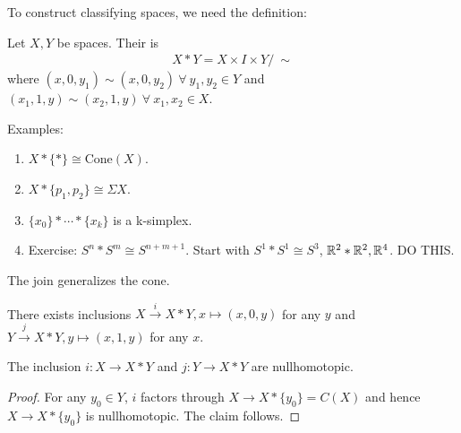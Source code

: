 \documentclass[12pt,class=article,crop=false]{standalone}
\begin{document}
To construct classifying spaces, we need the definition:
\begin{defn}
Let $ X,Y$ be spaces. Their   is
\begin{align*}
	X *Y = X \times I \times Y / \ \sim
\end{align*}
where $ (x,0,y_1) \sim (x,0,y_2) \ \forall \ y_1,y_2 \in Y$ and $ (x_1,1,y) \sim (x_2,1,y) \ \forall \ x_1,x_2 \in X$.
\end{defn}
Examples:
\begin{enumerate}[label=(\arabic*)]
	\item $ X* \{*\} \cong \text{Cone}(X) $.
	\item $ X* \{p_1,p_2\} \cong \Sigma X$.
	\item $ \{x_0\} * \cdots * \{x_k\} $ is a k-simplex.
	\item Exercise: $ S^{n}*S^{m} \cong S^{n+m+1}$. Start with $ S^{1} * S^{1} \cong S^3$, $ \mathbb{R}^2 * \mathbb{R}^2, \mathbb{R}^{4}$. DO THIS.
\end{enumerate}
\begin{remark}
The join generalizes the cone.
\end{remark}

There exists inclusions $ X \xrightarrow{ i} X *Y, x\mapsto (x,0,y) $ for any $ y$ and  $ Y \xrightarrow{ j} X*Y, y \mapsto (x,1,y) $ for any $ x$.

\begin{lem}
The inclusion $ i: X \to X*Y$ and $ j: Y \to X*Y$ are nullhomotopic.
\end{lem}

\begin{proof}
For any $ y_0 \in Y$, $ i$ factors through  $ X \to X * \{y_0\} = C(X) $ and hence $ X \to X* \{y_0\} $ is nullhomotopic. The claim follows.
\end{proof}
\end{document}

